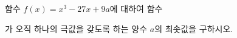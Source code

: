 함수 $f(x)=x^3-27x+9a$에 대하여 함수\par\smallskip{}\par\smallskip\noindent 가 오직 하나의 극값을 갖도록 하는 양수 $a$의 최솟값을 구하시오.
